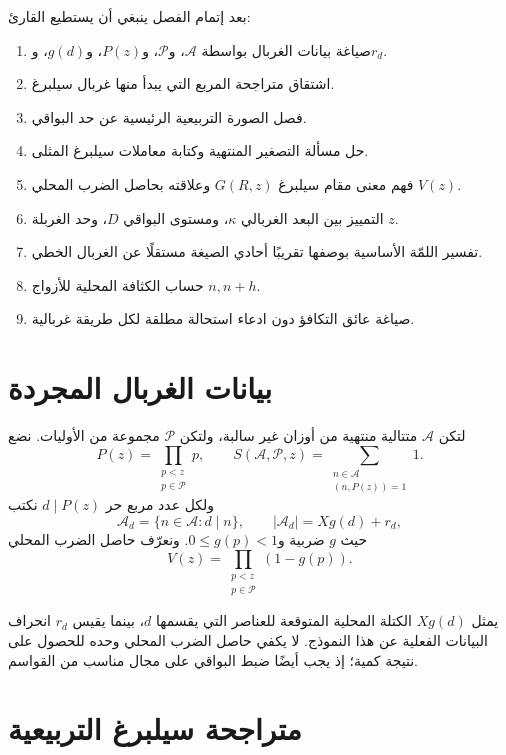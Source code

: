 بعد إتمام الفصل ينبغي أن يستطيع القارئ:
\begin{enumerate}
  \item صياغة بيانات الغربال بواسطة \(\mathcal A\)، و\(\mathcal P\)، و\(P(z)\)،
  و\(g(d)\)، و\(r_d\).
  \item اشتقاق متراجحة المربع التي يبدأ منها غربال سيلبرغ.
  \item فصل الصورة التربيعية الرئيسية عن حد البواقي.
  \item حل مسألة التصغير المنتهية وكتابة معاملات سيلبرغ المثلى.
  \item فهم معنى مقام سيلبرغ \(G(R,z)\) وعلاقته بحاصل الضرب المحلي \(V(z)\).
  \item التمييز بين البعد الغربالي \(\kappa\)، ومستوى البواقي \(D\)، وحد الغربلة \(z\).
  \item تفسير اللمّة الأساسية بوصفها تقريبًا أحادي الصيغة مستقلًا عن الغربال الخطي.
  \item حساب الكثافة المحلية للأزواج \(n,n+h\).
  \item صياغة عائق التكافؤ دون ادعاء استحالة مطلقة لكل طريقة غربالية.
\end{enumerate}

\section{بيانات الغربال المجردة}

\begin{definition}
\label{def:chapter15-sieve-data}
لتكن \(\mathcal A\) متتالية منتهية من أوزان غير سالبة، ولتكن \(\mathcal P\)
مجموعة من الأوليات. نضع
\[
P(z)=\prod_{\substack{p<z\\p\in\mathcal P}}p,
\qquad
S(\mathcal A,\mathcal P,z)
=
\sum_{\substack{n\in\mathcal A\\(n,P(z))=1}}1.
\]
ولكل عدد مربع حر \(d\mid P(z)\) نكتب
\[
\mathcal A_d=\{n\in\mathcal A:d\mid n\},
\qquad
|\mathcal A_d|=Xg(d)+r_d,
\]
حيث \(g\) ضربية و\(0\le g(p)<1\). ونعرّف حاصل الضرب المحلي
\[
V(z)=\prod_{\substack{p<z\\p\in\mathcal P}}(1-g(p)).
\]
\end{definition}

يمثل \(Xg(d)\) الكتلة المحلية المتوقعة للعناصر التي يقسمها \(d\)، بينما يقيس
\(r_d\) انحراف البيانات الفعلية عن هذا النموذج. لا يكفي حاصل الضرب المحلي وحده
للحصول على نتيجة كمية؛ إذ يجب أيضًا ضبط البواقي على مجال مناسب من القواسم.

\section{متراجحة سيلبرغ التربيعية}

